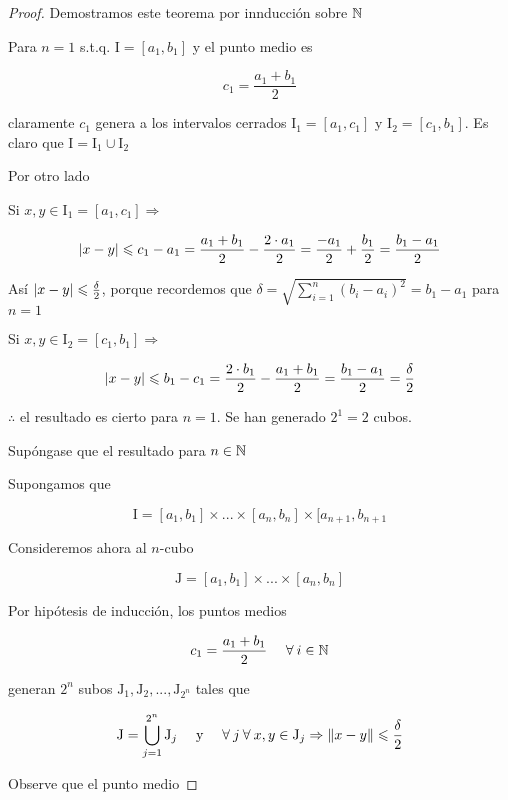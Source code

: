 \begin{proof}
    Demostramos este teorema por innducción sobre $\mathbb{N}$

    Para $n = 1$ s.t.q. $ \mathrm{I} = [a_{1},b_{1}]$ y el punto medio es 

     $$c_1 = \frac{a_1+b_1}{2}$$

     claramente $c_1$ genera a los intervalos cerrados $ \mathrm{I}_{1} = [a_{1},c_{1}]$ y $ \mathrm{I}_{2} = [c_{1},b_{1}]$. Es claro que $\mathrm{I} = \mathrm{I}_1 \cup \mathrm{I}_2$

     Por otro lado

     Si $x,y \in \mathrm{I}_1 = [a_1, c_1] \Rightarrow$

     $$\abs{x-y} \leqslant c_1 - a_1 = \frac{a_1+b_1}{2} - \frac{2 \cdot a_1}{2} = \frac{- a_1}{2} + \frac{b_1}{2} = \frac{b_1-a_1}{2}$$

     Así $\abs{x-y} \leqslant \frac{\delta}{2}$, porque recordemos que $\delta = \sqrt{\sum_{i=1}^{n}{(b_i-a_i)}^{2}} = b_1-a_1$ para $n=1$

     Si $x,y \in \mathrm{I}_2 = [c_1, b_1] \Rightarrow$

     $$\abs{x-y} \leqslant b_1 - c_1 = \frac{2 \cdot b_1}{2} - \frac{a_1+b_1}{2}  = \frac{b_1-a_1}{2} = \frac{\delta}{2}$$

     $\therefore$ el resultado es cierto para $n=1$. Se han generado $2^1 = 2$ cubos.

     Supóngase que el resultado para $n \in \mathbb{N}$

     Supongamos que

     $$\mathrm{I} = [a_1,b_1] \times ... \times [a_n,b_n] \times [a_{n+1},b_{n+1}$$

     Consideremos ahora al $n$-cubo

     $$\mathrm{J} =  [a_1,b_1] \times ... \times [a_n,b_n] $$

     Por hipótesis de inducción, los puntos medios 

     $$c_1 = \frac{a_1+b_1}{2} \: \: \: \: \: \: \forall \: i \in \mathbb{N}$$

     generan $2^n$ subos $\mathrm{J}_1,\mathrm{J}_2,...,\mathrm{J}_{2^n}$ tales que

     \begin{align*}
         \mathrm{J} = \bigcup_{j=1}^{2^n} \mathrm{J}_{j} && \text{ y } && \forall \: j \: \forall \: x,y \in \mathrm{J}_j \Rightarrow \norm{x-y} \leqslant \frac{\delta}{2}
     \end{align*}

     Observe que el punto medio 


\end{proof}
